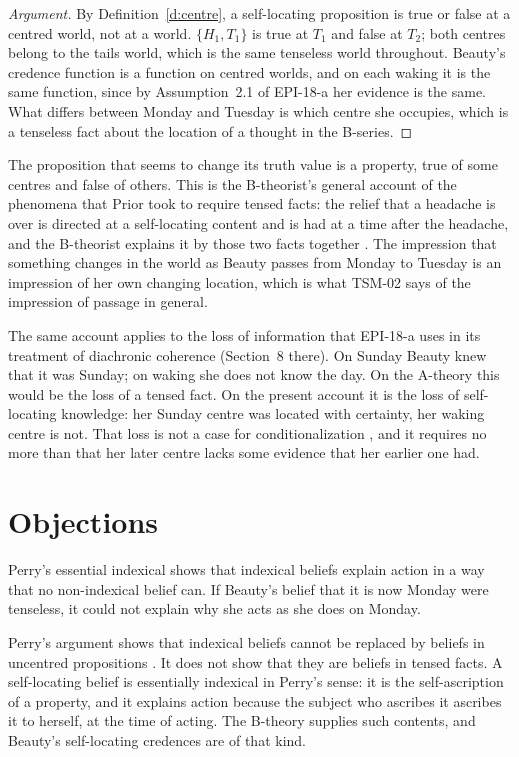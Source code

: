 \documentclass{situationist-preprint}
\begin{document}
\begin{proof}[Argument]
By Definition~\ref{d:centre}, a self-locating proposition is true or false at a centred world, not at a world. $\{H_1, T_1\}$ is true at $T_1$ and false at $T_2$; both centres belong to the tails world, which is the same tenseless world throughout. Beauty's credence function is a function on centred worlds, and on each waking it is the same function, since by Assumption~2.1 of EPI-18-a her evidence is the same. What differs between Monday and Tuesday is which centre she occupies, which is a tenseless fact about the location of a thought in the B-series.
\end{proof}

The proposition that seems to change its truth value is a property, true of some centres and false of others. This is the B-theorist's general account of the phenomena that Prior took to require tensed facts: the relief that a headache is over is directed at a self-locating content and is had at a time after the headache, and the B-theorist explains it by those two facts together \citep{Mellor1998}. The impression that something changes in the world as Beauty passes from Monday to Tuesday is an impression of her own changing location, which is what TSM-02 says of the impression of passage in general.

The same account applies to the loss of information that EPI-18-a uses in its treatment of diachronic coherence (Section~8 there). On Sunday Beauty knew that it was Sunday; on waking she does not know the day. On the A-theory this would be the loss of a tensed fact. On the present account it is the loss of self-locating knowledge: her Sunday centre was located with certainty, her waking centre is not. That loss is not a case for conditionalization \citep{Arntzenius2003}, and it requires no more than that her later centre lacks some evidence that her earlier one had.

\section{Objections}

\begin{objection}
Perry's essential indexical shows that indexical beliefs explain action in a way that no non-indexical belief can. If Beauty's belief that it is now Monday were tenseless, it could not explain why she acts as she does on Monday.
\end{objection}

\begin{reply}
Perry's argument shows that indexical beliefs cannot be replaced by beliefs in uncentred propositions \citep{Perry1979}. It does not show that they are beliefs in tensed facts. A self-locating belief is essentially indexical in Perry's sense: it is the self-ascription of a property, and it explains action because the subject who ascribes it ascribes it to herself, at the time of acting. The B-theory supplies such contents, and Beauty's self-locating credences are of that kind.
\end{reply}
\end{document}
